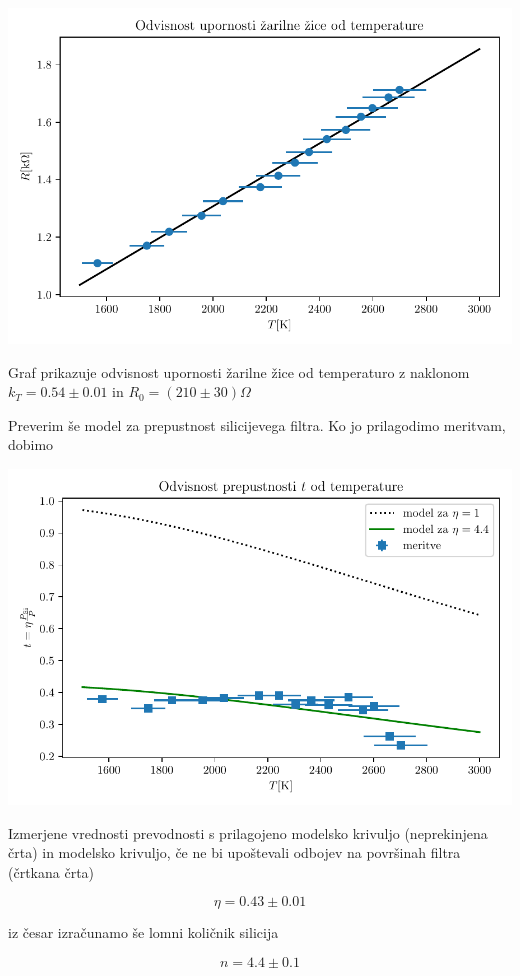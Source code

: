 \documentclass[12pt]{report}
\begin{document}
\begin{slika}[H]
  \centering
  \includegraphics{RT}
  \caption{\small Graf prikazuje odvisnost upornosti žarilne žice od temperaturo z naklonom $k_T = 0.54 \pm 0.01$ in $R_0 = (210 \pm 30) \si{\Omega}$}
\end{slika}

Preverim še model za prepustnost silicijevega filtra. Ko jo prilagodimo meritvam, dobimo

\begin{slika}[H]
  \centering
  \includegraphics{tT}
  \caption{\small Izmerjene vrednosti prevodnosti s prilagojeno modelsko krivuljo (neprekinjena črta) in modelsko krivuljo, če ne bi upoštevali odbojev na površinah filtra (črtkana črta)}
\end{slika}

\[
\eta = 0.43 \pm 0.01  
\]

iz česar izračunamo še lomni količnik silicija 

\[
n = 4.4 \pm 0.1
\]
\end{document}

